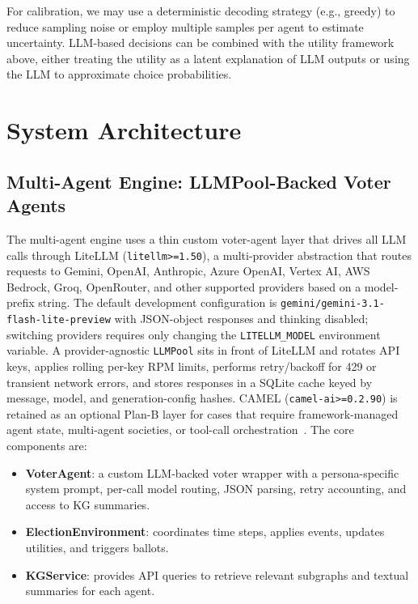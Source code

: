 \documentclass[11pt]{article}
\begin{document}
For calibration, we may use a deterministic decoding strategy (e.g., greedy) to reduce sampling noise or employ multiple samples per agent to estimate uncertainty. LLM-based decisions can be combined with the utility framework above, either treating the utility as a latent explanation of LLM outputs or using the LLM to approximate choice probabilities.

\section{System Architecture}

\subsection{Multi-Agent Engine: LLMPool-Backed Voter Agents}

The multi-agent engine uses a thin custom voter-agent layer that drives all LLM calls through LiteLLM (\texttt{litellm>=1.50}), a multi-provider abstraction that routes requests to Gemini, OpenAI, Anthropic, Azure OpenAI, Vertex AI, AWS Bedrock, Groq, OpenRouter, and other supported providers based on a model-prefix string. The default development configuration is \texttt{gemini/gemini-3.1-flash-lite-preview} with JSON-object responses and thinking disabled; switching providers requires only changing the \texttt{LITELLM\_MODEL} environment variable. A provider-agnostic \texttt{LLMPool} sits in front of LiteLLM and rotates API keys, applies rolling per-key RPM limits, performs retry/backoff for 429 or transient network errors, and stores responses in a SQLite cache keyed by message, model, and generation-config hashes. CAMEL (\texttt{camel-ai>=0.2.90}) is retained as an optional Plan-B layer for cases that require framework-managed agent state, multi-agent societies, or tool-call orchestration~\cite{li2023camel}. The core components are:

\begin{itemize}
  \item \textbf{VoterAgent}: a custom LLM-backed voter wrapper with a persona-specific system prompt, per-call model routing, JSON parsing, retry accounting, and access to KG summaries.
  \item \textbf{ElectionEnvironment}: coordinates time steps, applies events, updates utilities, and triggers ballots.
  \item \textbf{KGService}: provides API queries to retrieve relevant subgraphs and textual summaries for each agent.
\end{itemize}
\end{document}
